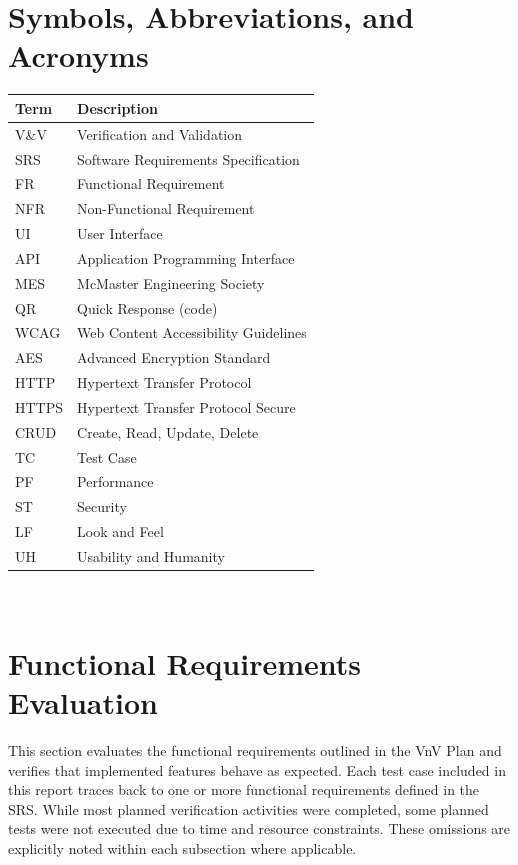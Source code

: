\documentclass[12pt, titlepage]{article}
\begin{document}
\section{Symbols, Abbreviations, and Acronyms}
\renewcommand{\arraystretch}{1.2}
\begin{tabularx}{\textwidth}{p{3.2cm}X}
  \toprule
  \textbf{Term} & \textbf{Description}\\
  \midrule
    V\&V & Verification and Validation \\
    SRS & Software Requirements Specification \\
    FR & Functional Requirement \\
    NFR & Non-Functional Requirement \\
    UI & User Interface \\
    API & Application Programming Interface \\
    MES & McMaster Engineering Society \\
    QR & Quick Response (code) \\
    WCAG & Web Content Accessibility Guidelines \\
    AES & Advanced Encryption Standard \\
    HTTP & Hypertext Transfer Protocol \\
    HTTPS & Hypertext Transfer Protocol Secure \\
    CRUD & Create, Read, Update, Delete \\
    TC & Test Case \\
    PF & Performance \\
    ST & Security \\
    LF & Look and Feel \\
    UH & Usability and Humanity \\
    \bottomrule
\end{tabularx}\\

\newpage


\section{Functional Requirements Evaluation}

This section evaluates the functional requirements outlined in the VnV Plan and verifies that implemented features behave as expected. Each test case included in this report traces back to one or more functional requirements defined in the SRS. While most planned verification activities were completed, some planned tests were not executed due to time and resource constraints. These omissions are explicitly noted within each subsection where applicable.
\end{document}

